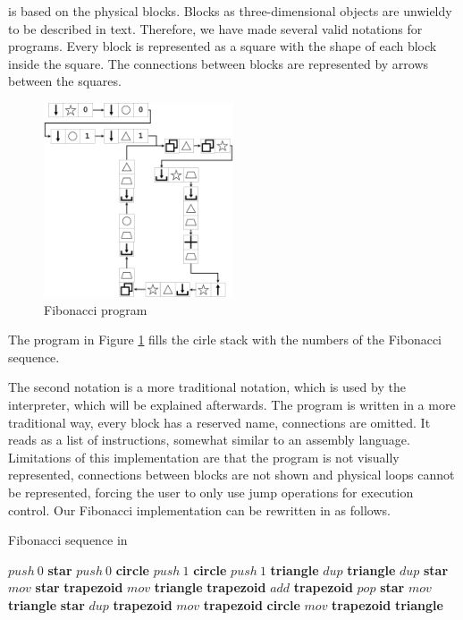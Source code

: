 \sculpt is based on the physical blocks. Blocks as three-dimensional objects are unwieldy to be described in text.
Therefore, we have made several valid notations for \sculpt programs.
Every block is represented as a square with the shape of each block inside the square. 
The connections between blocks are represented by arrows between the squares.

\begin{figure}
    \centering
    \includegraphics[width=0.5\textwidth]{figures/ArtlangFibpng}
    \caption{\sculpt Fibonacci program}
    \label{fig:artlangfib}
    \vspace{5pt}
\end{figure}

The program in Figure \ref{fig:artlangfib} fills the cirle stack with the numbers of the Fibonacci sequence.

The second notation is a more traditional notation, which is used by the \sculpter interpreter, which will be explained afterwards.
The program is written in a more traditional way, every block has a reserved name, connections are omitted. It reads as a list of instructions, somewhat similar to an assembly language.
Limitations of this implementation are that the program is not visually represented, connections between blocks are not shown and physical loops cannot be represented, forcing the user to only use jump operations for execution control.
Our Fibonacci implementation can be rewritten in \sculpter as follows.

\begin{algorithm}
    \caption{Fibonacci sequence in \sculpt}
    \label{alg:fib}
    \begin{algorithmic}
    \State $push~0$ \textbf{star}
    \State $push~0$ \textbf{circle}
    \State $push~1$ \textbf{circle}
    \State $push~1$ \textbf{triangle}
        \State $dup$ \textbf{triangle}
        \State $dup$ \textbf{star}
        \State $mov$ \textbf{star} \textbf{trapezoid}
        \State $mov$ \textbf{triangle} \textbf{trapezoid}
        \State $add$ \textbf{trapezoid}
        \State $pop$ \textbf{star}
        \State $mov$ \textbf{triangle} \textbf{star}
        \State $dup$ \textbf{trapezoid}
        \State $mov$ \textbf{trapezoid} \textbf{circle}
        \State $mov$ \textbf{trapezoid} \textbf{triangle}
    \EndWhile
    \end{algorithmic}
    \end{algorithm}
\endinput

